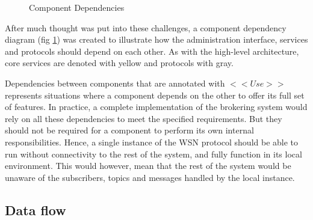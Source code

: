 \begin{center}
  \begin{figure}[ht!]
    \caption{Component Dependencies}
    \label{fig:architecture_dependency}
  \end{figure}
\end{center}

After much thought was put into these challenges, a component dependency diagram (fig \ref{fig:architecture_dependency}) was created to illustrate how the administration interface, services and protocols should depend on each other. As with the high-level architecture, core services are denoted with yellow and protocols with gray.

Dependencies between components that are annotated with $<< Use >>$ represents situations where a component depends on the other to offer its full set of features. In practice, a complete implementation of the brokering system would rely on all these dependencies to meet the specified requirements. But they should not be required for a component to perform its own internal responsibilities. Hence, a single instance of the WSN protocol should be able to run without connectivity to the rest of the system, and fully function in its local environment. This would however, mean that the rest of the system would be unaware of the subscribers, topics and messages handled by the local instance.

\clearpage

\subsection{Data flow}
\label{subsec:architecture_and_implementation-broker_architecture-data_flow}

